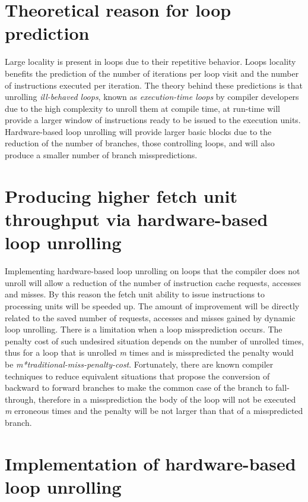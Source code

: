\documentclass[11pt]{article}
\begin{document}
\parskip 3mm




\section{Theoretical reason for loop prediction}

Large locality is present in loops due to their repetitive behavior. Loops locality benefits the prediction of the number of iterations per loop visit and the number of instructions executed per iteration. The theory behind these predictions is that unrolling {\it  ill-behaved loops}, known as {\it  execution-time loops} by compiler developers due to the high complexity to unroll them at compile time, at run-time will provide a larger window of instructions ready to be issued to the execution units. Hardware-based loop unrolling will provide larger basic blocks due to the reduction of the number of branches, those controlling loops, and will also produce a smaller number of branch misspredictions. 

\section{Producing higher fetch unit throughput via hardware-based loop unrolling}       

Implementing hardware-based loop unrolling on loops that the compiler does not unroll will allow a reduction of the number of instruction cache requests, accesses and misses. By this reason the fetch unit ability to issue instructions to processing units will be speeded up. The amount of improvement will be directly related to the saved number of requests, accesses and misses gained by dynamic loop unrolling. There is a limitation when a loop missprediction occurs. The penalty cost of such undesired situation depends on the number of unrolled times, thus for a loop that is unrolled {\it m} times and is misspredicted the penalty would be {\it m*traditional-miss-penalty-cost}. Fortunately, there are known compiler techniques to reduce equivalent situations that propose the conversion of backward to forward branches \cite{davidson95} to make the common case of the branch to fall-through, therefore in a missprediction the body of the loop will not be executed {\it m} erroneous times and the penalty will be not larger than that of a misspredicted branch. 

\section{Implementation of hardware-based loop unrolling}
\end{document}
